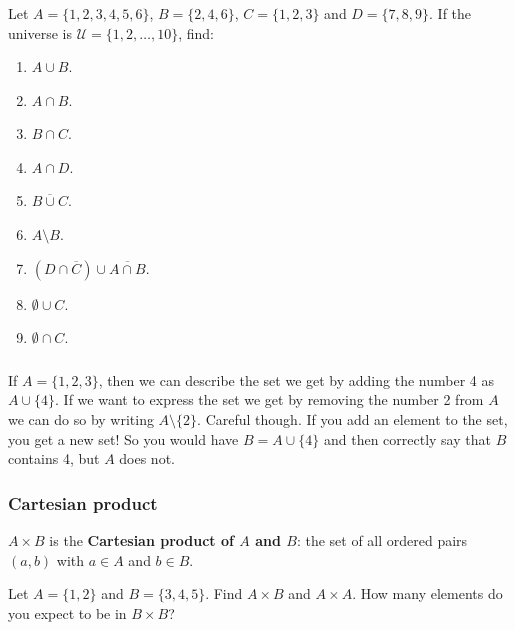 \documentclass[11pt, compress]{beamer}
\newcommand{\terminology}[1]{\textbf{#1}}\newcommand{\lt}{<}
\newcommand{\U}{\mathcal U}
\renewcommand{\bar}{\overline}
\begin{document}
\begin{frame}
\frametitle{}
\begin{example}[0.3.6]Let \(A = \{1, 2, 3, 4, 5, 6\}\), \(B = \{2, 4, 6\}\), \(C = \{1, 2, 3\}\) and \(D = \{7, 8, 9\}\). If the universe is \(\U = \{1, 2, \ldots, 10\}\), find:\begin{enumerate}
\item{} \(A \cup B\).

\item{} \(A \cap B\).

\item{} \(B \cap C\).

\item{} \(A \cap D\).

\item{} \(\bar{B \cup C}\).

\item{} \(A \setminus B\).

\item{} \((D \cap \bar C) \cup \bar{A \cap B}\).

\item{} \(\emptyset \cup C\).

\item{} \(\emptyset \cap C\).
\end{enumerate}

\end{example}
\end{frame}
 
\begin{frame}
\frametitle{}
\begin{example}[0.3.7]If \(A = \{1,2,3\}\), then we can describe the set we get by adding the number 4 as \(A \cup \{4\}\).  If we want to express the set we get by removing the number 2 from \(A\) we can do so by writing \(A \setminus \{2\}\).
Careful though.  If you add an element to the set, you get a new set!  So you would have \(B = A \cup \{4\}\) and then correctly say that \(B\) contains 4, but \(A\) does not.
\end{example}
\end{frame}
 
\begin{frame}
\frametitle{Cartesian product}
 \(A \times B\) is the \terminology{Cartesian product of \(A\) and \(B\)}: the set of all ordered pairs \((a,b)\) with \(a \in A\) and \(b \in B\).
 \begin{example}[0.3.8]Let \(A = \{1,2\}\) and \(B = \{3,4,5\}\). Find \(A \times B\) and \(A \times A\). How many elements do you expect to be in \(B \times B\)?
\end{example}
\end{frame}
 
\end{document}
